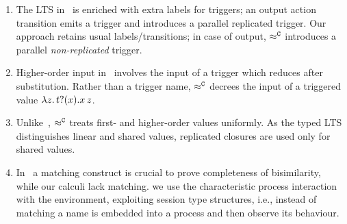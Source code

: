 \begin{enumerate}[$\bullet$]
\item 
The LTS in~\cite{JeffreyR05} is enriched with extra labels for triggers;
an output action transition emits a trigger and introduces a parallel replicated trigger.
Our 
approach retains usual labels/transitions; in  case of output,
$\approx^\mathtt{C}$
introduces a parallel
\emph{non-replicated} trigger.

\item Higher-order input in~\cite{JeffreyR05} involves 
the input of a trigger which reduces after substitution.
Rather than a trigger name, %
$\approx^\mathtt{C}$
decrees the input of a triggered value $\lambda z.\,t ? (x) . x\, {z}$.

\item Unlike~\cite{JeffreyR05}, 
$\approx^\mathtt{C}$ treats  
first- and higher-order values uniformly. %
As the typed LTS distinguishes linear and shared values,
replicated closures are used only for shared values.

\item In~\cite{JeffreyR05} a matching construct is
crucial to prove completeness of bisimilarity,
while our calculi lack matching. 
we use the characteristic
process interaction with the environment, exploiting 
session type structures, i.e., instead of matching 
a name is embedded into a process and then observe its behaviour.


\end{enumerate}



